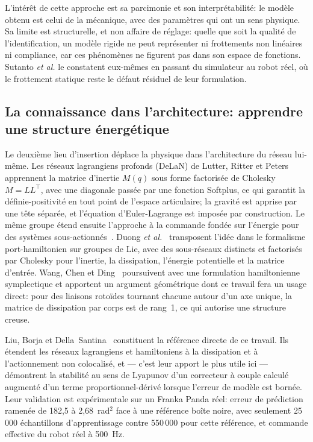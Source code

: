 \documentclass[a4paper, oneside]{article}
\newcommand{\q}{\ensuremath{q}}
\begin{document}
L'intérêt de cette approche est sa parcimonie et son interprétabilité: le
modèle obtenu est celui de la mécanique, avec des paramètres qui ont un sens
physique. Sa limite est structurelle, et non affaire de réglage: quelle que
soit la qualité de l'identification, un modèle rigide ne peut représenter ni
frottements non linéaires ni compliance, car ces phénomènes ne figurent pas
dans son espace de fonctions. Sutanto \emph{et al.} le constatent eux-mêmes en
passant du simulateur au robot réel, où le frottement statique reste le défaut
résiduel de leur formulation.

\subsection{La connaissance dans l'architecture: apprendre une structure
énergétique}
\label{sec:sota-archi}

Le deuxième lieu d'insertion déplace la physique dans l'architecture du réseau
lui-même. Les réseaux lagrangiens profonds (DeLaN) de Lutter, Ritter et
Peters~\cite{lutter2019iclr} apprennent la matrice d'inertie $M(\q)$ sous forme
factorisée de Cholesky $M = LL^{\top}$, avec une diagonale passée par une
fonction Softplus, ce qui garantit la définie-positivité en tout point de
l'espace articulaire; la gravité est apprise par une tête séparée, et
l'équation d'Euler-Lagrange est imposée par construction. Le même groupe étend
ensuite l'approche à la commande fondée sur l'énergie pour des systèmes
sous-actionnés~\cite{lutter2019iros}. Duong \emph{et al.}~\cite{duong2024}
transposent l'idée dans le formalisme port-hamiltonien sur groupes de Lie, avec
des sous-réseaux distincts et factorisés par Cholesky pour l'inertie, la
dissipation, l'énergie potentielle et la matrice d'entrée.
Wang, Chen et Ding~\cite{wang2025spel} poursuivent avec une formulation
hamiltonienne symplectique et apportent un argument géométrique dont ce travail
fera un usage direct: pour des liaisons rotoïdes tournant chacune autour d'un
axe unique, la matrice de dissipation par corps est de rang~1, ce qui autorise
une structure creuse.

Liu, Borja et Della~Santina~\cite{liu2024} constituent la référence directe de
ce travail. Ils étendent les réseaux lagrangiens et hamiltoniens à la
dissipation et à l'actionnement non colocalisé, et — c'est leur apport le plus
utile ici — démontrent la stabilité au sens de Lyapunov d'un correcteur à
couple calculé augmenté d'un terme proportionnel-dérivé lorsque l'erreur de
modèle est bornée. Leur validation est expérimentale sur un Franka Panda réel:
erreur de prédiction ramenée de 182{,}5 à 2{,}68~rad$^2$ face à une référence
boîte noire, avec seulement 25\,000 échantillons d'apprentissage contre
550\,000 pour cette référence, et commande effective du robot réel à \SI{500}{Hz}.
\end{document}
